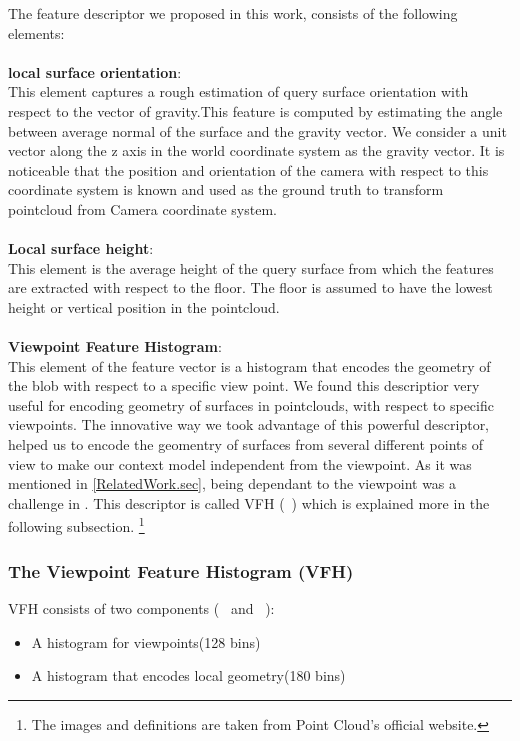 The feature descriptor we proposed in this work, consists of the following elements:\\
\\
{\bf local surface orientation}:\\
This element captures a rough estimation of query surface orientation with respect to the vector of gravity.This feature is computed by estimating the angle between average normal of the surface and the gravity vector. We consider a unit vector along the z axis in the world coordinate system as the gravity vector. It is noticeable that the position and orientation of the camera with respect to this coordinate system is known and used as
the ground truth to transform pointcloud from Camera coordinate system.\\
\\
{\bf Local surface height}:\\
This element is the average height of the query surface from which the features are extracted with respect to the floor. The floor is assumed to have the lowest height or vertical position in the pointcloud.\\
\\
{\bf Viewpoint Feature Histogram}:\\
This element of the feature vector is a histogram that encodes the geometry of the blob with respect to a specific view point. We found this descriptior very useful for encoding geometry of surfaces in pointclouds, with respect to specific viewpoints. The innovative way we took advantage of this powerful descriptor, helped us to encode the geomentry of surfaces from several different points of view to make our context model independent from the viewpoint. As it was mentioned in \ref{RelatedWork.sec}, being dependant to the viewpoint was a challenge in \cite{aydemir2012_3Dcontext}.
This descriptor is called VFH (~\cite{5651280}) which is explained more in the following subsection. \footnote{The images and definitions are taken from Point Cloud's official website.}

\subsubsection*{The Viewpoint Feature Histogram (VFH)}
\label{VFH.ssec}
 

VFH consists of two components (~\cite{VFH_Definition} and ~\cite{5651280}):


\begin{itemize}
 \item A histogram for viewpoints(128 bins)
 \item A histogram that encodes local geometry(180 bins)
\end{itemize}

